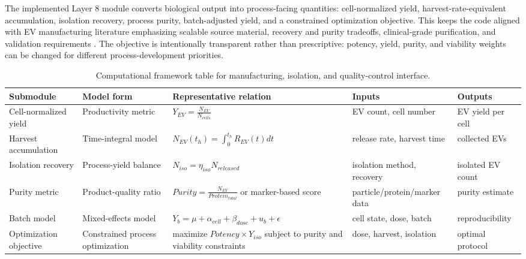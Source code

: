 The implemented Layer 8 module converts biological output into process-facing quantities: cell-normalized yield, harvest-rate-equivalent accumulation, isolation recovery, process purity, batch-adjusted yield, and a constrained optimization objective. This keeps the code aligned with EV manufacturing literature emphasizing scalable source material, recovery and purity tradeoffs, clinical-grade purification, and validation requirements \cite{paganini2019scalable,watson2018scalable,mendt2018generation,thakur2024global,welsh2024minimal}. The objective is intentionally transparent rather than prescriptive: potency, yield, purity, and viability weights can be changed for different process-development priorities.

\begin{table}[t]
\footnotesize\sf
\centering
\caption{Computational framework table for manufacturing, isolation, and quality-control interface.\label{T_A16_comp_manufacturing}}
\begin{tabular}{p{2.6cm} p{3.0cm} p{4.6cm} p{2.8cm} p{2.8cm}}
\toprule
\textbf{Submodule} & \textbf{Model form} & \textbf{Representative relation} & \textbf{Inputs} & \textbf{Outputs} \\
\midrule
Cell-normalized yield & Productivity metric \cite{welsh2024minimal,paganini2019scalable,mendt2018generation} & $Y_{EV}=\frac{N_{EV}}{N_{cells}}$ & EV count, cell number & EV yield per cell \\
Harvest accumulation & Time-integral model \cite{orlacchio2023effects,gudvangen2022electroporation,mendt2018generation} & $N_{EV}(t_h)=\int_0^{t_h}R_{EV}(t)dt$ & release rate, harvest time & collected EVs \\
Isolation recovery & Process-yield balance \cite{watson2018scalable,brennan2020comparison,webber2013pure} & $N_{iso}=\eta_{iso}N_{released}$ & isolation method, recovery & isolated EV count \\
Purity metric & Product-quality ratio \cite{webber2013pure,brennan2020comparison,welsh2024minimal} & $Purity=\frac{N_{EV}}{Protein_{total}}$ or marker-based score & particle/protein/marker data & purity estimate \\
Batch model & Mixed-effects model \cite{paganini2019scalable,watson2018scalable,mendt2018generation,thakur2024global} & $Y_{b}=\mu+\alpha_{cell}+\beta_{dose}+u_b+\epsilon$ & cell state, dose, batch & reproducibility \\
Optimization objective & Constrained process optimization \cite{paganini2019scalable,watson2018scalable,mendt2018generation,thakur2024global,welsh2024minimal} & maximize $Potency\times Y_{iso}$ subject to purity and viability constraints & dose, harvest, isolation & optimal protocol \\
\bottomrule
\end{tabular}
\end{table}

